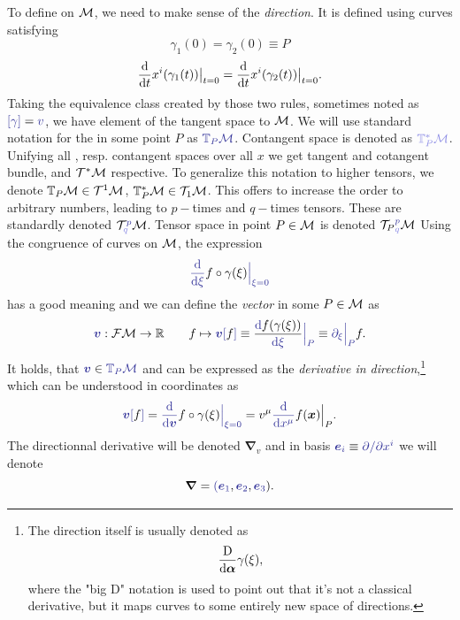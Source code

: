 To define  on $\mathcal{M}$, we need to make sense of the \emph{direction}. It is defined using curves satisfying 
$$\gamma_1(0)=\gamma_2(0)\equiv P$$
$$\frac{\mathrm{d} }{\mathrm{d} t}x^i(\gamma_1(t))\big|_{t=0}=\frac{\mathrm{d} }{\mathrm{d} t}x^i(\gamma_2(t))\big|_{t=0}.$$
Taking the equivalence class created by those two rules, sometimes noted as $\bluee{[\gamma]}=\bluee v$, we have element of the tangent space to $\mathcal{M}$. We will use standard notation for the  in some point $P$ as $\bluee{\T_P\M}$. Contangent space is denoted as $\blueee{\T^*_P\M}$. Unifying all , resp. contangent spaces over all $x$ we get tangent and cotangent bundle, \bluee{$\TT\M$} and $\mathcal{T}^*\mathcal{M}$ respective. To generalize this notation to higher tensors, we denote $\mathbb{T}_P\mathcal{M}\in \mathcal{T}^1\mathcal{M}$, $\mathbb{T}^*_P\mathcal{M}\in \mathcal{T}_1\mathcal{M}$. This offers to increase the order to arbitrary numbers, leading to $p-$times  and $q-$times  tensors. These are standardly denoted $\TT^{\bluee p}_{\blueee q} \M$. Tensor space in point $P\in\mathcal{M}$ is denoted ${\TT_P}^{\bluee p}_{\blueee q} \M$
Using the congruence of curves on $\mathcal{M}$, the expression 
\begin{equation}
    \bluee{\der{}{\xi}}f\circ \gamma(\xi)\bluee{\Big|_{\xi=0}}
\end{equation}
has a good meaning and we can define the \emph{vector} in some $P\in\mathcal{M}$ as
\begin{equation}
    \bluee{\bm v}: \FM\rightarrow \R \qquad f\mapsto \bluee{\bm v[}f\bluee ]\equiv \frac{\bluee \d f(\gamma(\xi))}{\bluee{\d \xi}}\bluee{\Big|_P} \equiv \bluee{\partial_\xi\Big|_P} f .
\end{equation}
It holds, that $\bluee{\bm v}\in \bluee{\T_P\M}$ and can be expressed as the \emph{derivative in direction},\footnote{
        The direction itself is usually denoted as
        \begin{equation}
            \frac{\mathrm{D}}{\mathrm{d}\bm\alpha}\gamma(\xi),
        \end{equation}
        where the "big D" notation is used to point out that it's not a classical derivative, but it maps curves to some entirely new space of directions.
    } 
which can be understood in coordinates as
\begin{equation}
    \bluee{\bm v[}f\bluee ] = \bluee{\der{}{\bm v}} f\circ \gamma(\xi)\bluee{\Big|_{\xi=0}}=v^\mu\bluee{\der{}{x^\mu}} f(\bm x)\Big|_{P}.
\end{equation}
The directionnal derivative will be denoted $\bm\nabla_v$
and in basis $\bluee{\bm e_i} \equiv \bluee{\partial/\partial x^i}$ we will denote 
$$\bm\nabla=\bluee(\bluee{\bm e_1}, \bluee{\bm e_2},\bluee{\bm e_3}).$$


